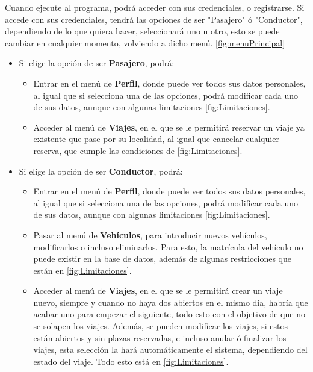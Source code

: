 \bigskip

Cuando ejecute al programa, podrá acceder con sus credenciales, o registrarse. Si accede con sus credenciales, tendrá las opciones de ser "Pasajero" ó "Conductor", 
dependiendo de lo que quiera hacer, seleccionará uno u otro, esto se puede cambiar en cualquier momento, volviendo a dicho menú. \ref{fig:menuPrincipal}

\begin{itemize}
  \item Si elige la opción de ser \textbf{Pasajero}, podrá:
  \begin{itemize}
    \item Entrar en el menú de \textbf{Perfil}, donde puede ver todos sus datos personales, al igual que si selecciona una de las opciones, podrá modificar cada uno de sus datos, aunque con algunas limitaciones \ref{fig:Limitaciones}.
    \item Acceder al menú de \textbf{Viajes}, en el que se le permitirá reservar un viaje ya existente que pase por su localidad, al igual que cancelar cualquier reserva, que cumple las condiciones de \ref{fig:Limitaciones}.
  \end{itemize}
  \item Si elige la opción de ser \textbf{Conductor}, podrá:
  \begin{itemize}
    \item Entrar en el menú de \textbf{Perfil}, donde puede ver todos sus datos personales, al igual que si selecciona una de las opciones, podrá modificar cada uno de sus datos, aunque con algunas limitaciones \ref{fig:Limitaciones}.
    \item Pasar al menú de \textbf{Vehículos}, para introducir nuevos vehículos, modificarlos o incluso eliminarlos. Para esto, la matrícula del vehículo no puede existir en la base de datos, además de algunas restricciones que están en \ref{fig:Limitaciones}.
    \item Acceder al menú de \textbf{Viajes}, en el que se le permitirá crear un viaje nuevo, siempre y cuando no haya dos abiertos en el mismo día, habría que acabar uno para empezar el siguiente,
    todo esto con el objetivo de que no se solapen los viajes. Además, se pueden modificar los viajes, si estos están abiertos y sin plazas reservadas, e incluso anular ó finalizar los viajes,
    esta selección la hará automáticamente el sistema, dependiendo del estado del viaje. Todo esto está en \ref{fig:Limitaciones}.
  \end{itemize}
\end{itemize}

